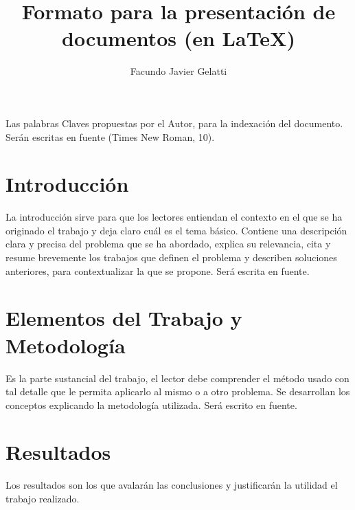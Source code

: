 
\usepackage{amsmath}
\usepackage{amsfonts}
\usepackage{amssymb}

\author{Facundo Javier Gelatti}
\title{Formato para la presentación de documentos (en \LaTeX)}


\titulo

\begin{multicols}{2}

Las palabras Claves propuestas por el Autor, para la
indexación del documento. Serán escritas en fuente
(Times New Roman, 10).

\section{Introducción}
La introducción sirve para que los lectores
entiendan el contexto en el que se ha originado el
trabajo y deja claro cuál es el tema básico. Contiene
una descripción clara y precisa del problema que se ha
abordado, explica su relevancia, cita y resume
brevemente los trabajos que definen el problema y
describen soluciones anteriores, para contextualizar la
que se propone. Será escrita en fuente.

\section{Elementos del Trabajo y Metodología}
Es la parte sustancial del trabajo, el lector debe
comprender el método usado con tal detalle que le
permita aplicarlo al mismo o a otro problema. Se
desarrollan los conceptos explicando la metodología
utilizada. Será escrito en fuente.

\section{Resultados}
Los resultados son los que avalarán las conclusiones
y justificarán la utilidad el trabajo realizado.


\end{multicols}
